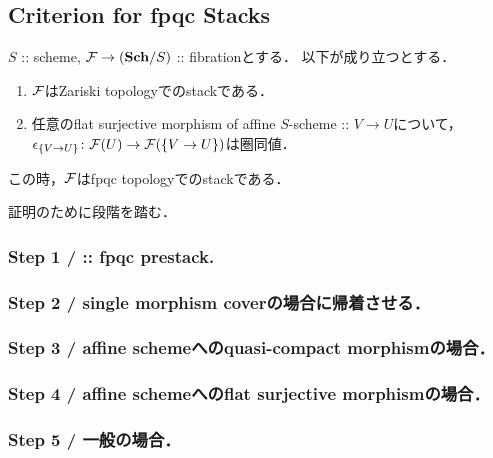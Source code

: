 \documentclass[a4paper]{jsarticle}
\begin{document}
\subsection{Criterion for fpqc Stacks}
\begin{Lemma}
    $S$ :: scheme,
    $\mathcal{F} \to (\mathbf{Sch}/S)$ :: fibrationとする．
    以下が成り立つとする．
    \begin{enumerate}[label=(\alph*)]
        \item $\mathcal{F}$はZariski topologyでのstackである．
        \item
            任意のflat surjective morphism of affine $S$-scheme :: $V \to U$について，\mnewline
            $\epsilon_{\{V \to U\}} \colon \mathcal{F}(U) \to \mathcal{F}(\{V \to U\})$は圏同値．
    \end{enumerate}
    この時，$\mathcal{F}$はfpqc topologyでのstackである．
\end{Lemma}

証明のために段階を踏む．
\subsubsection{Step 1 /  :: fpqc prestack.}

\subsubsection{Step 2 / single morphism coverの場合に帰着させる．}

\subsubsection{Step 3 / affine schemeへのquasi-compact morphismの場合．}

\subsubsection{Step 4 / affine schemeへのflat surjective morphismの場合．}

\subsubsection{Step 5 / 一般の場合．}



\end{document}
